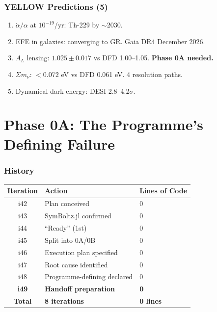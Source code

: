 \documentclass[11pt,a4paper]{article}
\begin{document}
\section{YELLOW Predictions (5)}

\begin{enumerate}
\item $\dot{\alpha}/\alpha$ at $10^{-19}$/yr: Th-229 by $\sim$2030.
\item EFE in galaxies: converging to GR. Gaia DR4 December 2026.
\item $A_L$ lensing: $1.025 \pm 0.017$ vs DFD 1.00--1.05. \textbf{Phase 0A needed.}
\item $\Sigma m_\nu$: $< 0.072$ eV vs DFD 0.061 eV. 4 resolution paths.
\item Dynamical dark energy: DESI 2.8--4.2$\sigma$.
\end{enumerate}


\part{Phase 0A: The Programme's Defining Failure}

\section{History}

\begin{center}
\begin{tabular}{cll}
\toprule
\textbf{Iteration} & \textbf{Action} & \textbf{Lines of Code} \\
\midrule
i42 & Plan conceived & 0 \\
i43 & SymBoltz.jl confirmed & 0 \\
i44 & ``Ready'' (1st) & 0 \\
i45 & Split into 0A/0B & 0 \\
i46 & Execution plan specified & 0 \\
i47 & Root cause identified & 0 \\
i48 & Programme-defining declared & 0 \\
\textbf{i49} & \textbf{Handoff preparation} & \textbf{0} \\
\midrule
\textbf{Total} & \textbf{8 iterations} & \textbf{0 lines} \\
\bottomrule
\end{tabular}
\end{center}
\end{document}

